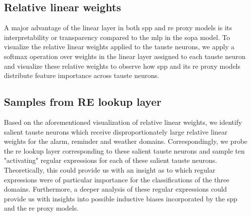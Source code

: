 \subsection{Relative linear weights}

A major advantage of the linear layer in both \ac{spp} and \ac{re} proxy models is its
interpretability or transparency compared to the \ac{mlp} in the \ac{sopa} model. To
visualize the relative linear weights applied to the \ac{tauste} neurons, we apply a
softmax operation over weights in the linear layer assigned to each \ac{tauste}
neuron and visualize these relative weights to observe how \ac{spp} and its \ac{re}
proxy models distribute feature importance across \ac{tauste} neurons.

\subsection{Samples from RE lookup layer}

Based on the aforementioned visualization of relative linear weights, we
identify salient \ac{tauste} neurons which receive disproportionately large relative
linear weights for the alarm, reminder and weather domains. Correspondingly,
we probe the \ac{re} lookup layer corresponding to these salient \ac{tauste} neurons and
sample ten "activating" regular expressions for each of these salient \ac{tauste}
neurons. Theoretically, this could provide us with an insight as to which
regular expressions were of particular importance for the classifications of the
three domains. Furthermore, a deeper analysis of these regular expressions
could provide us with insights into possible inductive biases incorporated by the
\ac{spp} and the \ac{re} proxy models.


